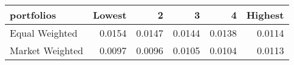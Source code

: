 \begin{tabular}{lrrrrr}
\toprule
portfolios &  Lowest &      2 &      3 &      4 &  Highest \\
\midrule
Equal Weighted  &  0.0154 & 0.0147 & 0.0144 & 0.0138 &   0.0114 \\
Market Weighted &  0.0097 & 0.0096 & 0.0105 & 0.0104 &   0.0113 \\
\bottomrule
\end{tabular}
